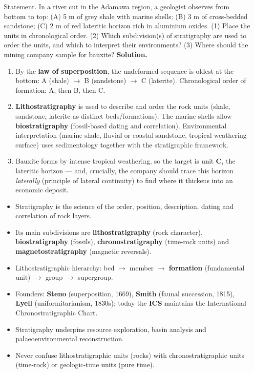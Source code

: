 \documentclass[11pt]{article}
\begin{document}
\begin{exoresolu}
Statement. In a river cut in the Adamawa region, a geologist observes from bottom to top: (A) 5 m of grey shale with marine shells; (B) 3 m of cross-bedded sandstone; (C) 2 m of red lateritic horizon rich in aluminium oxides. (1) Place the units in chronological order. (2) Which subdivision(s) of stratigraphy are used to order the units, and which to interpret their environments? (3) Where should the mining company sample for bauxite?
\tcblower
\textbf{Solution.}
\begin{enumerate}
\item By the \textbf{law of superposition}, the undeformed sequence is oldest at the bottom: A (shale) $\rightarrow$ B (sandstone) $\rightarrow$ C (laterite). Chronological order of formation: A, then B, then C.
\item \textbf{Lithostratigraphy} is used to describe and order the rock units (shale, sandstone, laterite as distinct beds/formations). The marine shells allow \textbf{biostratigraphy} (fossil-based dating and correlation). Environmental interpretation (marine shale, fluvial or coastal sandstone, tropical weathering surface) uses sedimentology together with the stratigraphic framework.
\item Bauxite forms by intense tropical weathering, so the target is unit \textbf{C}, the lateritic horizon --- and, crucially, the company should trace this horizon \emph{laterally} (principle of lateral continuity) to find where it thickens into an economic deposit.
\end{enumerate}
\end{exoresolu}

\begin{aretenir}
\begin{itemize}
\item Stratigraphy is the science of the order, position, description, dating and correlation of rock layers.
\item Its main subdivisions are \textbf{lithostratigraphy} (rock character), \textbf{biostratigraphy} (fossils), \textbf{chronostratigraphy} (time-rock units) and \textbf{magnetostratigraphy} (magnetic reversals).
\item Lithostratigraphic hierarchy: bed $\rightarrow$ member $\rightarrow$ \textbf{formation} (fundamental unit) $\rightarrow$ group $\rightarrow$ supergroup.
\item Founders: \textbf{Steno} (superposition, 1669), \textbf{Smith} (faunal succession, 1815), \textbf{Lyell} (uniformitarianism, 1830s); today the \textbf{ICS} maintains the International Chronostratigraphic Chart.
\item Stratigraphy underpins resource exploration, basin analysis and palaeoenvironmental reconstruction.
\item Never confuse lithostratigraphic units (rocks) with chronostratigraphic units (time-rock) or geologic-time units (pure time).
\end{itemize}
\end{aretenir}
\end{document}
